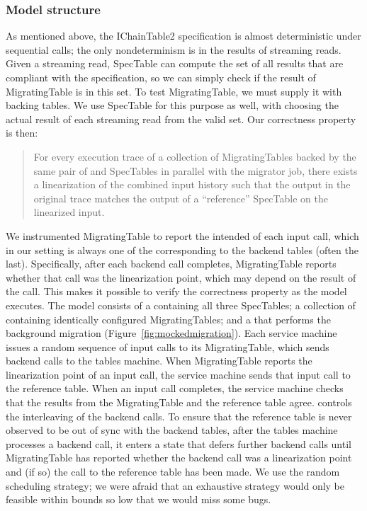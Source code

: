 \subsubsection{Model structure}

As mentioned above, the IChainTable2 specification is almost deterministic under sequential calls; the only nondeterminism is in the results of streaming reads.  Given a streaming read, SpecTable can compute the set of all results that are compliant with the specification, so we can simply check if the result of MigratingTable is in this set.  To test MigratingTable, we must supply it with backing tables.  We use SpecTable for this purpose as well, with \psharp choosing the actual result of each streaming read from the valid set.  Our correctness property is then:
\begin{quote}
For every execution trace of a collection of MigratingTables backed by the same pair of  and  SpecTables in parallel with the migrator job, there exists a linearization of the combined input history such that the output in the original trace matches the output of a ``reference'' SpecTable on the linearized input.
\end{quote}
%
We instrumented MigratingTable to report the intended  of each input call, which in our setting is always one of the corresponding  to the backend tables (often the last).  Specifically, after each backend call completes, MigratingTable reports whether that call was the linearization point, which may depend on the result of the call.  This makes it possible to verify the correctness property as the model executes.  The model consists of a \psharp {} containing all three SpecTables; a collection of  containing identically configured MigratingTables; and a  that performs the background migration (Figure~\ref{fig:mockedmigration}).  Each service machine issues a random sequence of input calls to its MigratingTable, which sends backend calls to the tables machine.  When MigratingTable reports the linearization point of an input call, the service machine sends that input call to the reference table.  When an input call completes, the service machine checks that the results from the MigratingTable and the reference table agree.  \psharp controls the interleaving of the backend calls.  To ensure that the reference table is never observed to be out of sync with the backend tables, after the tables machine processes a backend call, it enters a state that defers further backend calls until MigratingTable has reported whether the backend call was a linearization point and (if so) the call to the reference table has been made.  We use the \psharp random scheduling strategy; we were afraid that an exhaustive strategy would only be feasible within bounds so low that we would miss some bugs.


